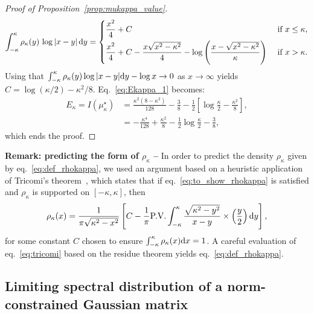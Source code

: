{\begin{proof}[Proof of Proposition~\ref{prop:mukappa_value}]
    \begin{equation*}
        \int_{-\kappa}^\kappa \rho_\kappa(y) \, \log |x-y| \, \mathrm{d} y =
        \begin{dcases}
            \frac{x^2}{4} + C & \textrm{ if } x \leq \kappa, \\ 
            \frac{x^2}{4} + C - \frac{x\sqrt{x^2-\kappa^2}}{4} - \log\left(\frac{x-\sqrt{x^2-\kappa^2}}{\kappa}\right) & \textrm{ if } x > \kappa.
        \end{dcases}
    \end{equation*}
    Using that $\int_{-\kappa}^\kappa \rho_\kappa(y) \log |x-y| \mathrm{d} y - \log x \to 0$ as $x \to \infty$ yields $C = \log(\kappa/2) - \kappa^2/8$.
    Eq.~\eqref{eq:Ekappa_1} becomes:
    \begin{align*}
        E_\kappa = I(\mu_\kappa^\star) &= \frac{\kappa^2(8-\kappa^2)}{128} - \frac{3}{8}  - \frac{1}{2} \left[\log \frac{\kappa}{2} - \frac{\kappa^2}{8}\right], \\ 
        &= - \frac{\kappa^4}{128} + \frac{\kappa^2}{8} - \frac{1}{2} \log \frac{\kappa}{2} - \frac{3}{8},
    \end{align*}
    which ends the proof.
\end{proof}
\myskip
\textbf{Remark: predicting the form of $\rho_\kappa$ --} In order to predict the density $\rho_\kappa$ given by eq.~\eqref{eq:def_rhokappa}, 
we used an argument based on a heuristic application of Tricomi's theorem~\citep{tricomi1985integral}, which states that if eq.~\eqref{eq:to_show_rhokappa} is satisfied 
and $\rho_\kappa$ is supported on $[-\kappa,\kappa]$, then 
\begin{equation}\label{eq:tricomi}
    \rho_\kappa(x) = \frac{1}{\pi \sqrt{\kappa^2-x^2}}\left[C - \frac{1}{\pi} \textrm{P.V.} \int_{-\kappa}^\kappa \frac{\sqrt{\kappa^2-y^2}}{x-y} \times \left(\frac{y}{2}\right) \mathrm{d} y\right],
\end{equation}
for some constant $C$ chosen to ensure $\int_{-\kappa}^\kappa \rho_\kappa(x) \mathrm{d} x = 1$.
A careful evaluation of eq.~\eqref{eq:tricomi} based on the residue theorem yields eq.~\eqref{eq:def_rhokappa}.



\subsection{Limiting spectral distribution of a norm-constrained Gaussian matrix}\label{subsec:proof_lsd_constrained_GOE}

}
